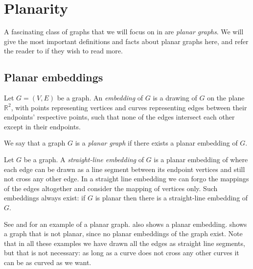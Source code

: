 \section{Planarity}
\label{section:planar-graphs}
A fascinating class of graphs that we will focus on in  are \emph{planar graphs}. We will give the most important definitions and facts about planar graphs here, and refer the reader to \cite{source:planar_graphs} if they wish to read more.

\subsection{Planar embeddings}
\begin{definition}[Embedding]
    Let $G = (V,E)$ be a graph. An \emph{embedding} of $G$ is a drawing of $G$ on the plane $\mathbb{R}^2$, with points representing vertices and curves representing edges between their endpoints' respective points, such that none of the edges intersect each other except in their endpoints.
\end{definition}

\begin{definition}
    We say that a graph $G$ is a \emph{planar graph} if there exists a planar embedding of $G$.
\end{definition}

\begin{definition}
    Let $G$ be a graph. A \emph{straight-line embedding} of $G$ is a planar embedding of where each edge can be drawn as a line segment between its endpoint vertices and still not cross any other edge. In a straight line embedding we can forgo the mappings of the edges altogether and consider the mapping of vertices only. Such embeddings always exist: if $G$ is planar then there is a straight-line embedding of $G$.
\end{definition}

See  and  for an example of a planar graph.  also shows a planar embedding.  shows a graph that is not planar, since no planar embeddings of the graph exist. Note that in all these examples we have drawn all the edges as straight line segments, but that is not necessary: as long as a curve does not cross any other curves it can be as curved as we want.

